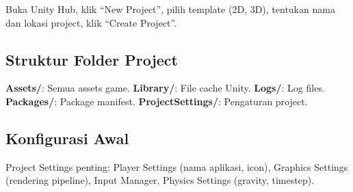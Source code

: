Buka Unity Hub, klik ``New Project'', pilih template (2D, 3D), tentukan nama dan lokasi project, klik ``Create Project''.

\subsection{Struktur Folder Project}

\textbf{Assets/}: Semua assets game. \textbf{Library/}: File cache Unity. \textbf{Logs/}: Log files. \textbf{Packages/}: Package manifest. \textbf{ProjectSettings/}: Pengaturan project.

\subsection{Konfigurasi Awal}

Project Settings penting: Player Settings (nama aplikasi, icon), Graphics Settings (rendering pipeline), Input Manager, Physics Settings (gravity, timestep).
